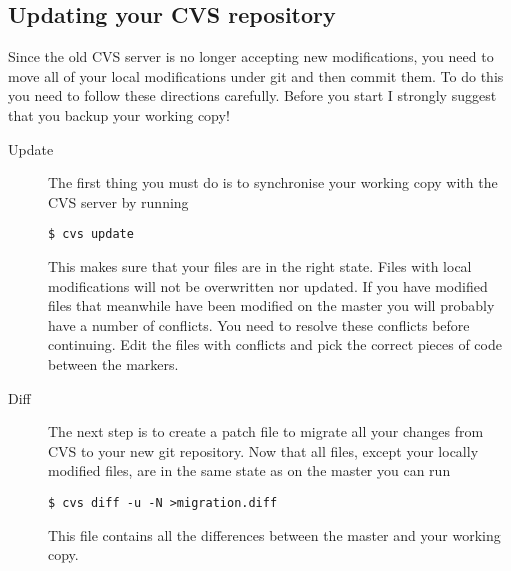 \documentclass[a4paper,10pt]{article}
\begin{document}
\subsection{Updating your CVS repository}
Since the old CVS server is no longer accepting new modifications, you need to
move all of your local modifications under git and then commit them. To do
this you need to follow these directions carefully. Before you start I
strongly suggest that you backup your working copy!
\begin{description}
\item[Update] The first thing you must do is to synchronise your working
copy with the CVS server by running
\begin{verbatim}
$ cvs update
\end{verbatim}
This makes sure that your files are in the right state. 
Files with local modifications will not be overwritten nor
updated. If you have modified files that meanwhile have been modified on the
master you will probably have a number of conflicts. You need to resolve these
conflicts before continuing. Edit the files with conflicts and pick the
correct pieces of code between the markers.
\item[Diff] The next step is to create a patch file to migrate all your
changes from CVS to your new git repository. 
Now that all files, except your locally modified files, are in the same state
as on the master you can run
\begin{verbatim}
$ cvs diff -u -N >migration.diff
\end{verbatim}
This file contains all the differences between the master and your working
copy.
\end{description}
\end{document}

